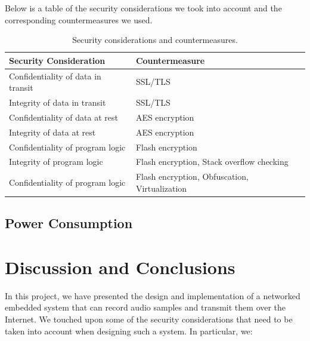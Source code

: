 \documentclass[conference]{IEEEtran}
\begin{document}
Below is a table of the security considerations we took into account and the corresponding countermeasures we used.

\begin{table}[h]
    \centering
\begin{adjustbox}{width=\columnwidth,center}
    \begin{tabular}{|l|l|}
        \hline
        \textbf{Security Consideration} & \textbf{Countermeasure} \\ \hline
        Confidentiality of data in transit & SSL/TLS \\ \hline
        Integrity of data in transit & SSL/TLS \\ \hline
        Confidentiality of data at rest & AES encryption \\ \hline
        Integrity of data at rest & AES encryption \\ \hline
        Confidentiality of program logic & Flash encryption \\ \hline
        Integrity of program logic & Flash encryption, Stack overflow checking \\ \hline
        Confidentiality of program logic & Flash encryption, Obfuscation, Virtualization \\ \hline
    \end{tabular}
\end{adjustbox}
    \caption{Security considerations and countermeasures.}
    \label{tab:security_considerations}
\end{table}

\subsection{Power Consumption}

\section{Discussion and Conclusions}
\label{sec:discussion_and_conclusions}

In this project, we have presented the design and implementation of a networked embedded system
that can record audio samples and transmit them over the Internet.
We touched upon some of the security considerations that need to be taken into account when designing such a system.
In particular, we:
\end{document}
